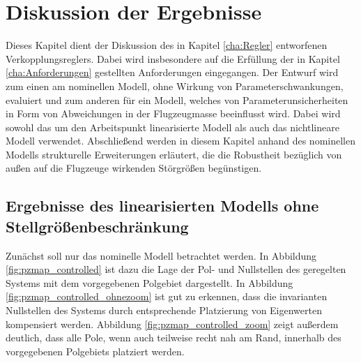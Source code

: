 \chapter{Diskussion der Ergebnisse}\label{cha:Robustheit}
Dieses Kapitel dient der Diskussion des in Kapitel \ref{cha:Regler} entworfenen Verkopplungsreglers. Dabei wird insbesondere auf die Erfüllung der in Kapitel \ref{cha:Anforderungen} gestellten Anforderungen eingegangen. Der Entwurf wird zum einen am nominellen Modell, ohne Wirkung von Parameterschwankungen, evaluiert und zum anderen für ein Modell, welches von Parameterunsicherheiten in Form von Abweichungen in der Flugzeugmasse beeinflusst wird. Dabei wird sowohl das um den Arbeitspunkt linearisierte Modell als auch das nichtlineare Modell verwendet. Abschließend werden in diesem Kapitel anhand des nominellen Modells strukturelle Erweiterungen erläutert, die die Robustheit bezüglich von außen auf die Flugzeuge wirkenden Störgrößen begünstigen.

\section{Ergebnisse des linearisierten Modells ohne Stellgrößenbeschränkung}
Zunächst soll nur das nominelle Modell betrachtet werden. In Abbildung \ref{fig:pzmap_controlled} ist dazu die Lage der Pol- und Nullstellen des geregelten Systems mit dem vorgegebenen Polgebiet dargestellt. In Abbildung \ref{fig:pzmap_controlled_ohnezoom} ist gut zu erkennen, dass die invarianten Nullstellen des Systems durch entsprechende Platzierung von Eigenwerten kompensiert werden. Abbildung \ref{fig:pzmap_controlled_zoom} zeigt außerdem deutlich, dass alle Pole, wenn auch teilweise recht nah am Rand, innerhalb des vorgegebenen Polgebiets platziert werden.

